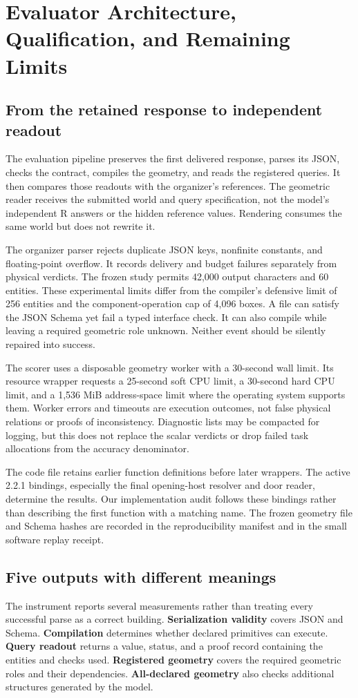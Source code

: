 \section{Evaluator Architecture, Qualification, and Remaining Limits}
\label{app:D}

\subsection{From the retained response to independent readout}
The evaluation pipeline preserves the first delivered response, parses its JSON, checks the contract, compiles the geometry, and reads the registered queries. It then compares those readouts with the organizer's references. The geometric reader receives the submitted world and query specification, not the model's independent R answers or the hidden reference values. Rendering consumes the same world but does not rewrite it.

The organizer parser rejects duplicate JSON keys, nonfinite constants, and floating-point overflow. It records delivery and budget failures separately from physical verdicts. The frozen study permits 42,000 output characters and 60 entities. These experimental limits differ from the compiler's defensive limit of 256 entities and the component-operation cap of 4,096 boxes. A file can satisfy the JSON Schema yet fail a typed interface check. It can also compile while leaving a required geometric role unknown. Neither event should be silently repaired into success.

The scorer uses a disposable geometry worker with a 30-second wall limit. Its resource wrapper requests a 25-second soft CPU limit, a 30-second hard CPU limit, and a 1,536 MiB address-space limit where the operating system supports them. Worker errors and timeouts are execution outcomes, not false physical relations or proofs of inconsistency. Diagnostic lists may be compacted for logging, but this does not replace the scalar verdicts or drop failed task allocations from the accuracy denominator.

The code file retains earlier function definitions before later wrappers. The active 2.2.1 bindings, especially the final opening-host resolver and door reader, determine the results. Our implementation audit follows these bindings rather than describing the first function with a matching name. The frozen geometry file and Schema hashes are recorded in the reproducibility manifest and in the small software replay receipt.

\subsection{Five outputs with different meanings}
The instrument reports several measurements rather than treating every successful parse as a correct building. \textbf{Serialization validity} covers JSON and Schema. \textbf{Compilation} determines whether declared primitives can execute. \textbf{Query readout} returns a value, status, and a proof record containing the entities and checks used. \textbf{Registered geometry} covers the required geometric roles and their dependencies. \textbf{All-declared geometry} also checks additional structures generated by the model.

